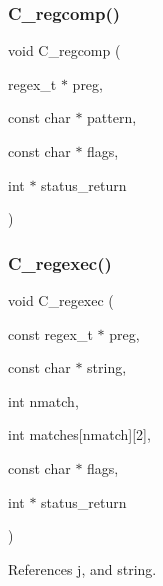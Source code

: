 \mbox{\label{C-M__regex_8c_a3fcdbec663d5285a401e73c4cdca37be}} 
\subsubsection{\texorpdfstring{C\+\_\+regcomp()}{C\_regcomp()}}
{\footnotesize\ttfamily void C\+\_\+regcomp (\begin{DoxyParamCaption}\item[{regex\+\_\+t $\ast$}]{preg,  }\item[{const char $\ast$}]{pattern,  }\item[{const char $\ast$}]{flags,  }\item[{int $\ast$}]{status\+\_\+return }\end{DoxyParamCaption})}

\mbox{\label{C-M__regex_8c_ad4d383ae55d866605fb7ff11e8cf99d8}} 
\subsubsection{\texorpdfstring{C\+\_\+regexec()}{C\_regexec()}}
{\footnotesize\ttfamily void C\+\_\+regexec (\begin{DoxyParamCaption}\item[{const regex\+\_\+t $\ast$}]{preg,  }\item[{const char $\ast$}]{string,  }\item[{int}]{nmatch,  }\item[{int}]{matches\mbox{[}nmatch\mbox{]}\mbox{[}2\mbox{]},  }\item[{const char $\ast$}]{flags,  }\item[{int $\ast$}]{status\+\_\+return }\end{DoxyParamCaption})}



References j, and string.


